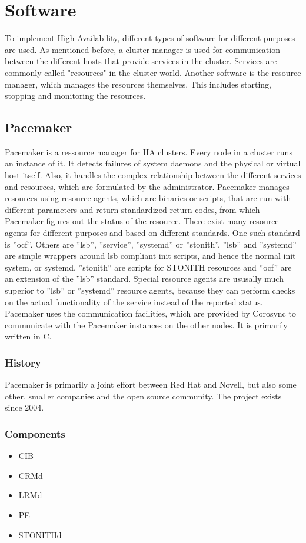 \section{Software}
To implement High Availability, different types of software for different purposes are used.
As mentioned before, a cluster manager is used for communication between the different hosts that
provide services in the cluster. Services are commonly called "resources" in the cluster world.
Another software is the resource manager, which manages the resources themselves.
This includes starting, stopping and monitoring the resources.
\subsection{Pacemaker}
Pacemaker is a ressource manager for \ac{HA} clusters. Every node in a cluster
runs an instance of it. It detects failures of system daemons and the physical or
virtual host itself. Also, it handles the complex relationship between the different
services and resources, which are formulated by the administrator. Pacemaker
manages resources using resource agents, which are binaries or scripts,
that are run with different parameters and return standardized return codes,
from which Pacemaker figures out the status of the resource. There exist many
resource agents for different purposes and based on different standards. One
such standard is ''ocf''. Others are ''lsb'', ''service'', ''systemd'' or ''stonith''.
''lsb'' and ''systemd'' are simple wrappers around \ac{lsb} compliant init scripts,
and hence the normal init system, or systemd. ''stonith'' are scripts for \ac{STONITH}
resources and ''ocf'' are an extension of the ''lsb'' standard.
Special resource agents are ususally much superior to ''lsb'' or ''systemd'' resource
agents, because they can perform checks on the actual functionality of the service instead
of the reported status.
Pacemaker uses the communication facilities, which are provided by Corosync
to communicate with the Pacemaker instances on the other nodes. It is primarily written in C.
\subsubsection{History}
Pacemaker is primarily a joint effort between Red Hat and Novell, but also
some other, smaller companies and the open source community. The project
exists since 2004.
\subsubsection{Components}
\begin{itemize}
\item \ac{CIB}
\item \ac{CRMd}
\item \ac{LRMd}
\item \ac{PE}
\item \ac{STONITHd}
\end{itemize}
